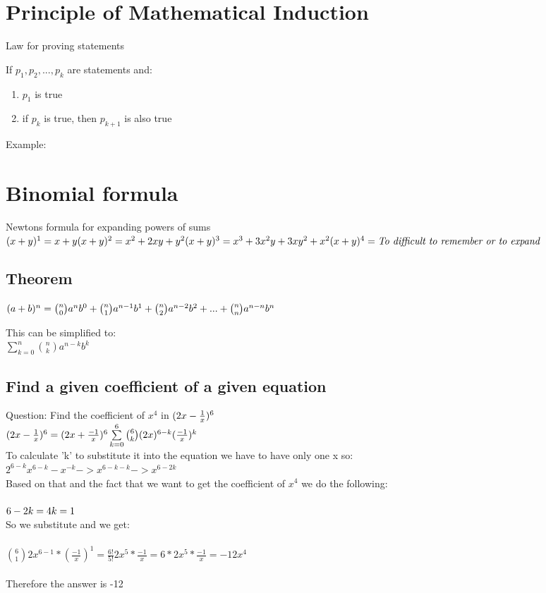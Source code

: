 \documentclass{article}
\begin{document}
\section{Principle of Mathematical Induction}
Law for proving statements

If $ p_{1}, p_{2}, ..., p_{k} $ are statements and: 
	\begin{enumerate}
		\item $p_{1}$ is true
		\item if $p_{k}$ is true, then $p_{k + 1}$ is also true
	\end{enumerate}
Example: 

\section{Binomial formula}
Newtons formula for expanding powers of sums\\
$
(x+y)^1 = x + y \\
(x+y)^2 = x^2 + 2xy + y^2 \\ 
(x+y)^3 = x^3 + 3x^2y + 3xy^2 + x^2 \\
(x+y)^4 = \emph{To difficult to remember or to expand}
$

\subsection{Theorem}
$
(a + b)^n = \binom{n}{0}a^nb^0 + \binom{n}{1} a^{n-1}b^{1} + \binom{n}{2} a^{n-2}b^{2} + ... + \binom{n}{n} a^{n-n}b^{n}\\
$

This can be simplified to: \\
$
\sum\limits_{k=0}^n \binom{n}{k}a^{n-k}b^k
$

\subsection{Find a given coefficient of a given equation}
Question: Find the coefficient of $x^4$ in $(2x - \frac{1}{x})^6 \\ \\$
\\
$(2x - \frac{1}{x})^6 = (2x + \frac{-1}{x})^6 \\  \\
\sum\limits_{k=0}^6 \binom{6}{k}(2x)^{6-k}(\frac{-1}{x})^k 
$\\
To calculate 'k' to substitute it into the equation we have to have only one x so: \\
$
2^{6-k}x^{6-k}-x^{-k} -> x^{6-k-k} -> x^{6-2k}
$\\
Based on that and the fact that we want to get the coefficient of $x^4$ we do the following: \\
\\
$
6-2k = 4 \\
k = 1
$\\
So we substitute and we get: \\
\\
$\binom{6}{1}2x^{6-1} * (\frac{-1}{x})^1 = \frac{6!}{5!}2x^5 * \frac{-1}{x} =  6 * 2x^5  * \frac{-1}{x} = -12x^4 $ \\ 
\\
Therefore the answer is -12 
\end{document}
